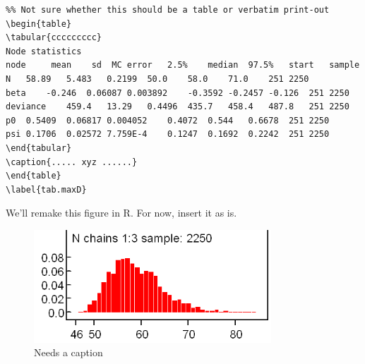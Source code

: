 \begin{verbatim}
%% Not sure whether this should be a table or verbatim print-out
\begin{table}
\tabular{ccccccccc}
Node statistics
node	 mean	 sd	 MC error	2.5%	median	97.5%	start	sample
N	58.89	5.483	0.2199	50.0	58.0	71.0	251	2250
beta	-0.246	0.06087	0.003892	-0.3592	-0.2457	-0.126	251	2250
deviance	459.4	13.29	0.4496	435.7	458.4	487.8	251	2250
p0	0.5409	0.06817	0.004052	0.4072	0.544	0.6678	251	2250
psi	0.1706	0.02572	7.759E-4	0.1247	0.1692	0.2242	251	2250
\end{tabular}
\caption{..... xyz ......}
\end{table}
\label{tab.maxD}
\end{verbatim}

We'll remake this figure in R.  For now, insert it as is.

\begin{figure}
\begin{center}
\includegraphics[width=3.5in]{figs/Nchains}
\end{center}
\caption{Needs a caption}
\label{fig.nchains}
\end{figure}

